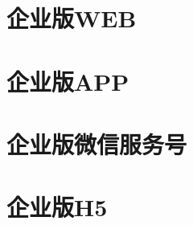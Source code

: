 \section{企业版WEB} 
\label{sec:inst_web}


\section{企业版APP} 
\label{sec:inst_app}


\clearpage
\section{企业版微信服务号} 
\label{sec:inst_wx}


\clearpage
\section{企业版H5} 
\label{sec:inst_h5}


